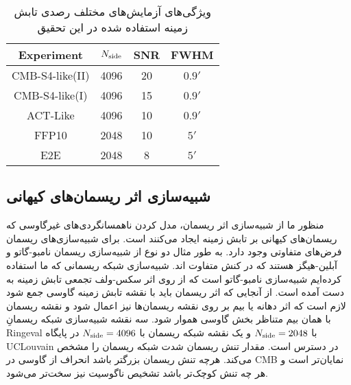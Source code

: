 \begin{table}[H]
	\centering
	\caption{ویژگی‌های آزمایش‌های مختلف رصدی تابش زمینه استفاده شده در این تحقیق}
	\label{Table:com_sim}
	 \begin{latin}
	\begin{tabular}{cccc}
		\hline
		Experiment     &    $ N_{\rm side}$        & SNR             & FWHM   \\ \hline
		CMB-S4-like(II)    & 4096         & 20              & $0.9'$ \\
		CMB-S4-like(I)     & 4096         & 15              & $0.9'$ \\
		ACT-Like           & 4096         & 10              & $0.9'$ \\
		FFP10        & 2048         & 10              & $5'$   \\
		E2E     & 2048      & 8     & $5'$   \\ \hline
	\end{tabular}
 \end{latin}
\end{table}

\subsection{شبیه‌سازی اثر ریسمان‌های کیهانی} 
 \label{sec:string_sims}
منظور ما از شبیه‌سازی اثر ریسمان، مدل کردن ناهمسانگردی‌های غیرگاوسی که ریسمان‌های کیهانی بر تابش زمینه ایجاد می‌کنند است. برای شبیه‌سازی‌های ریسمان فرض‌های متفاوتی وجود دارد. به طور مثال دو نوع از شبیه‌سازی ریسمان نامبو-گاتو
\cite{fraisse2008small}
و آبلین-هیگز
\cite{moore2001evolution , bevis2007cmb}
هستند که در کنش متفاوت اند. شبیه‌سازی شبکه ریسمانی که ما استفاده کرده‌ایم شبیه‌سازی نامبو-گاتو است که از روی اثر سکس-ولف تجمعی تابش زمینه به دست آمده است. از آنجایی که اثر ریسمان باید با نقشه تابش زمینه گاوسی جمع شود لازم است که اثر دهانه یا بیم بر روی نقشه ریسمان‌ها نیز اعمال شود و نقشه ریسمان با همان بیم متناظر بخش گاوسی هموار شود. سه نقشه شبیه‌سازی شبکه ریسمانِ Ringeval با 
 $N_{\rm side} = 2048$
 و یک نقشه شبکه ریسمان با
 $N_{\rm side} = 4096$
 در پایگاه UCLouvain
  در دسترس است.
مقدار تنش ریسمان شدت شبکه ریسمان را مشخص می‌کند. هرچه تنش ریسمان بزرگتر باشد انحراف از گاوسی در CMB نمایان‌تر است و هر چه تنش کوچک‌تر باشد تشخیص ناگوسیت نیز سخت‌تر می‌شود.


